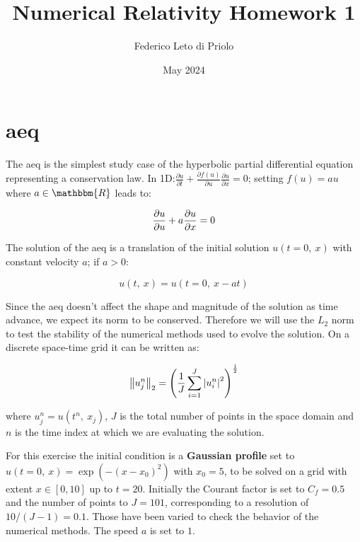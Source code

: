\documentclass[11pt, a4paper]{article}
\title{Numerical Relativity Homework 1}
\author{Federico Leto di Priolo}
\date{May 2024}
\begin{document}
\maketitle

\section{\acrfull{aeq}}

The \acrshort{aeq} is the simplest study case of the hyperbolic partial
differential equation representing a conservation law. In 1D:\(\frac{\partial
    u}{\partial t} + \frac{\partial f(u)}{\partial u} \frac{\partial u}{\partial x}
= 0\); setting \(f(u) = au\) where \(a \in \mathbbm{R}\) leads to:

\begin{equation} \label{eq:adv_eq}
    \pdv{u}{u} + a \pdv{u}{x} = 0
\end{equation}

\noindent
The solution of the \acrshort{aeq} is a translation of the initial solution
\(u(t = 0,\ x)\) with constant velocity \(a\); if \(a > 0\):

\begin{equation} \label{eq:adv_sol}
    u(t,\ x) = u(t = 0,\ x - at)
\end{equation}

Since the \acrshort{aeq} doesn't affect the shape and magnitude of the solution
as time advance, we expect its norm to be conserved. Therefore we will use the
\(L_2\) norm to test the stability of the numerical methods used to evolve the
solution. On a discrete space-time grid it can be written as:

\begin{equation} \label{eq:l2_norm}
    \norm{u^n_j}_2 = \qty(\frac{1}{J} \sum_{i = 1}^J \abs{u^n_i}^2)^\frac{1}{2}
\end{equation}

\noindent
where \(u^n_j = u(t^n,\ x_j)\), \(J\) is the total number of points in the space
domain and \(n\) is the time index at which we are evaluating the solution.

For this exercise the initial condition is a \textbf{Gaussian profile} set to
\(u(t = 0,\ x) = \exp(-(x - x_0)^2)\) with \(x_0 = 5\), to be solved on a grid
with extent \(x \in [0, 10]\) up to \(t = 20\). Initially the Courant factor is
set to \(C_f = 0.5\) and the number of points to \(J = 101\), corresponding to
a resolution of \(10 / (J - 1) = 0.1\). Those have been varied to check the
behavior of the numerical methods. The speed \(a\) is set to \(1\).
\end{document}
